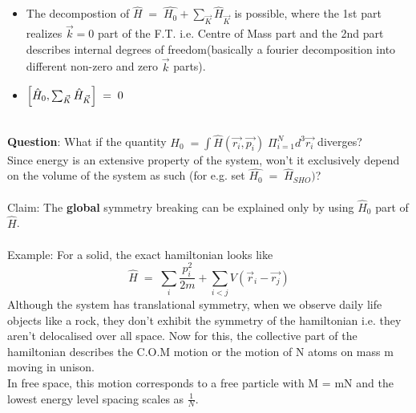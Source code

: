 \documentclass[12pt]{article}
\begin{document}
\begin{itemize}
    \item The decompostion of $\hat{H}\;=\;\hat{H_0} + \sum_{\Vec{K}}\hat{H}_{\Vec{K}}$ is possible, where the 1st part realizes $\Vec{k}=0$ part of the F.T. i.e. Centre of Mass part and the 2nd part describes internal degrees of freedom(basically a fourier decomposition into different non-zero and zero $\Vec{k}$ parts).
    \item $\comm{\hat{H}_0}{\sum_{\Vec{K}}\hat{H}_{\Vec{K}}}\;=\;0$
\end{itemize}\\
\textbf{Question}: What if the quantity $H_0\;=\int \hat{H}(\Vec{r_i},\Vec{p_i})\; \Pi_{i=1}^N d^3\Vec{r_i}$ diverges?\\ Since energy is an extensive property of the system, won't it exclusively depend on the volume of the system as such (for e.g. set $\hat{H_0}\;=\;\hat{H}_{SHO})$?\\
\\
Claim: The \textbf{global} symmetry breaking can be explained only by using $\hat{H}_0$ part of $\hat{H}$.\\
\\
Example: For a solid, the exact hamiltonian looks like
$$\hat{H}\;=\;\sum_i \frac{p_i^2}{2m}+\sum_{i<j}V(\Vec{r}_i-\Vec{r_j})$$
Although the system has translational symmetry, when we observe daily life objects like a rock, they don't exhibit the symmetry of the hamiltonian i.e. they aren't delocalised over all space. Now for this, the collective part of the hamiltonian describes the C.O.M motion or the motion of N atoms on mass m moving in unison.\\
In free space, this motion corresponds to a free particle with M = mN and the lowest energy level spacing scales as $\frac{1}{N}$.\\
\end{document}

